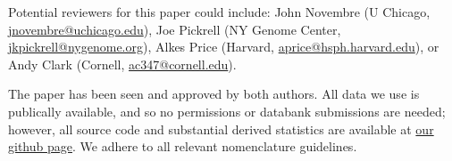 \documentclass[stdletter,letterpaper,addrfromright,orderfromdateto,dateleft,11pt,noaddrto,sigleft]{newlfm}
\begin{document}
\begin{newlfm}
Potential reviewers for this paper could include:
John Novembre (U Chicago, \href{mailto:jnovembre@uchicago.edu}{jnovembre@uchicago.edu}),
Joe Pickrell (NY Genome Center, \href{mailto:jkpickrell@nygenome.org}{jkpickrell@nygenome.org}),
Alkes Price (Harvard, \href{mailto:aprice@hsph.harvard.edu}{aprice@hsph.harvard.edu}),
or Andy Clark (Cornell, \href{mailto:ac347@cornell.edu}{ac347@cornell.edu}).


The paper has been seen and approved by both authors.  
All data we use is publically available, and so no permissions or databank submissions are needed;
however, all source code and substantial derived statistics are available at 
\href{https://github.com/petrelharp/local_pca}{our github page}.
We adhere to all relevant nomenclature guidelines.


\end{newlfm}
\end{document}
